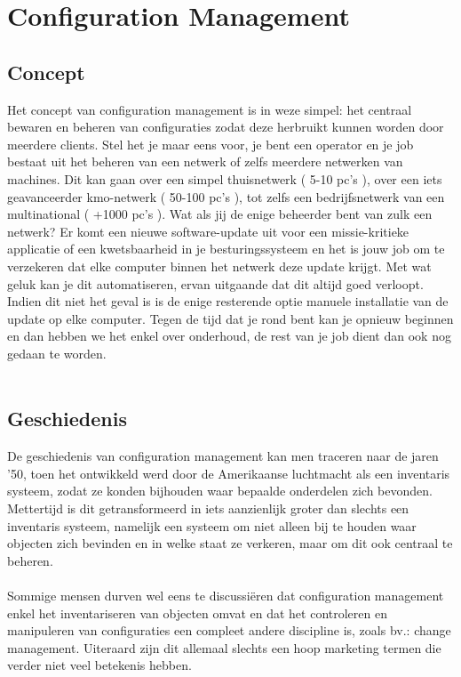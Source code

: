 \chapter{Configuration Management}
\section{Concept}
Het concept van configuration management is in weze simpel: het centraal bewaren en beheren van configuraties zodat deze herbruikt kunnen worden door meerdere clients. Stel het je maar eens voor, je bent een operator en je job bestaat uit het beheren van een netwerk of zelfs meerdere netwerken van machines. Dit kan gaan over een simpel thuisnetwerk ( 5-10 pc's ), over een iets geavanceerder kmo-netwerk ( 50-100 pc's ), tot zelfs een bedrijfsnetwerk van een multinational ( +1000 pc's ). Wat als jij de enige beheerder bent van zulk een netwerk? Er komt een nieuwe software-update uit voor een missie-kritieke applicatie of een kwetsbaarheid in je besturingssysteem en het is jouw job om te verzekeren dat elke computer binnen het netwerk deze update krijgt. Met wat geluk kan je dit automatiseren, ervan uitgaande dat dit altijd goed verloopt. Indien dit niet het geval is is de enige resterende optie manuele installatie van de update op elke computer. Tegen de tijd dat je rond bent kan je opnieuw beginnen en dan hebben we het enkel over onderhoud, de rest van je job dient dan ook nog gedaan te worden.\\\\

\section{Geschiedenis}
De geschiedenis van configuration management kan men traceren naar de jaren '50, toen het ontwikkeld werd door de Amerikaanse luchtmacht als een inventaris systeem, zodat ze konden bijhouden waar bepaalde onderdelen zich bevonden. Mettertijd is dit getransformeerd in iets aanzienlijk groter dan slechts een inventaris systeem, namelijk een systeem om niet alleen bij te houden waar objecten zich bevinden en in welke staat ze verkeren, maar om dit ook centraal te beheren.\\\\
Sommige mensen durven wel eens te discussi\"{e}ren dat configuration management enkel het inventariseren van objecten omvat en dat het controleren en manipuleren van configuraties een compleet andere discipline is, zoals bv.: change management. Uiteraard zijn dit allemaal slechts een hoop marketing termen die verder niet veel betekenis hebben.

